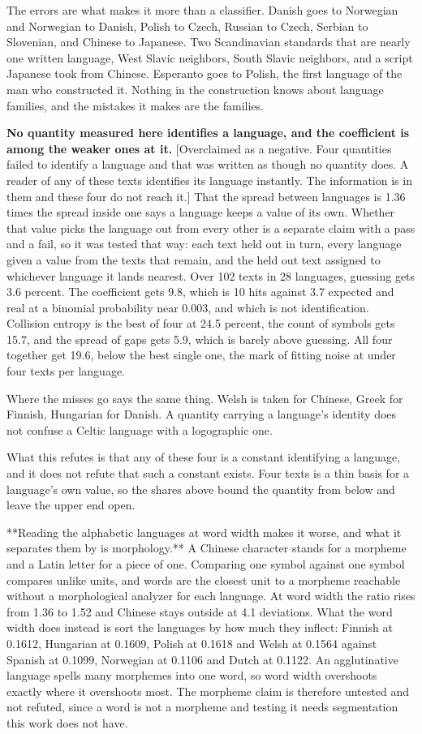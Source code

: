 The errors are what makes it more than a classifier. Danish goes to Norwegian and Norwegian to Danish, Polish to Czech, Russian to Czech, Serbian to Slovenian, and Chinese to Japanese. Two Scandinavian standards that are nearly one written language, West Slavic neighbors, South Slavic neighbors, and a script Japanese took from Chinese. Esperanto goes to Polish, the first language of the man who constructed it. Nothing in the construction knows about language families, and the mistakes it makes are the families.

\textbf{No quantity measured here identifies a language, and the coefficient is among the weaker ones at it.} [Overclaimed as a negative. Four quantities failed to identify a language and that was written as though no quantity does. A reader of any of these texts identifies its language instantly. The information is in them and these four do not reach it.] That the spread between languages is 1.36 times the spread inside one says a language keeps a value of its own. Whether that value picks the language out from every other is a separate claim with a pass and a fail, so it was tested that way: each text held out in turn, every language given a value from the texts that remain, and the held out text assigned to whichever language it lands nearest. Over 102 texts in 28 languages, guessing gets 3.6 percent. The coefficient gets 9.8, which is 10 hits against 3.7 expected and real at a binomial probability near 0.003, and which is not identification. Collision entropy is the best of four at 24.5 percent, the count of symbols gets 15.7, and the spread of gaps gets 5.9, which is barely above guessing. All four together get 19.6, below the best single one, the mark of fitting noise at under four texts per language.

Where the misses go says the same thing. Welsh is taken for Chinese, Greek for Finnish, Hungarian for Danish. A quantity carrying a language's identity does not confuse a Celtic language with a logographic one.

What this refutes is that any of these four is a constant identifying a language, and it does not refute that such a constant exists. Four texts is a thin basis for a language's own value, so the shares above bound the quantity from below and leave the upper end open.

**Reading the alphabetic languages at word width makes it worse, and what it separates them by is morphology.** A Chinese character stands for a morpheme and a Latin letter for a piece of one. Comparing one symbol against one symbol compares unlike units, and words are the closest unit to a morpheme reachable without a morphological analyzer for each language. At word width the ratio rises from 1.36 to 1.52 and Chinese stays outside at 4.1 deviations. What the word width does instead is sort the languages by how much they inflect: Finnish at 0.1612, Hungarian at 0.1609, Polish at 0.1618 and Welsh at 0.1564 against Spanish at 0.1099, Norwegian at 0.1106 and Dutch at 0.1122. An agglutinative language spells many morphemes into one word, so word width overshoots exactly where it overshoots most. The morpheme claim is therefore untested and not refuted, since a word is not a morpheme and testing it needs segmentation this work does not have.

